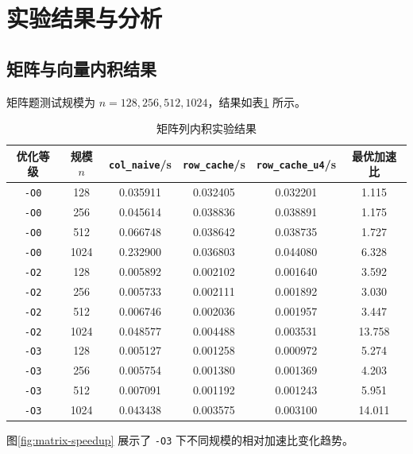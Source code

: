 \documentclass[a4paper]{article}
\begin{document}
\section{实验结果与分析}
\subsection{矩阵与向量内积结果}
矩阵题测试规模为 $n=128,256,512,1024$，结果如表\ref{tab:matrix} 所示。

\begin{table}[H]
  \centering
  \small
  \begin{tabular}{cccccc}
  \toprule
  优化等级 & 规模 $n$ & \texttt{col\_naive}/s & \texttt{row\_cache}/s & \texttt{row\_cache\_u4}/s & 最优加速比 \\
  \midrule
  \texttt{-O0} & 128  & 0.035911 & 0.032405 & 0.032201 & 1.115 \\
  \texttt{-O0} & 256  & 0.045614 & 0.038836 & 0.038891 & 1.175 \\
  \texttt{-O0} & 512  & 0.066748 & 0.038642 & 0.038735 & 1.727 \\
  \texttt{-O0} & 1024 & 0.232900 & 0.036803 & 0.044080 & 6.328 \\
  \midrule
  \texttt{-O2} & 128  & 0.005892 & 0.002102 & 0.001640 & 3.592 \\
  \texttt{-O2} & 256  & 0.005733 & 0.002111 & 0.001892 & 3.030 \\
  \texttt{-O2} & 512  & 0.006746 & 0.002036 & 0.001957 & 3.447 \\
  \texttt{-O2} & 1024 & 0.048577 & 0.004488 & 0.003531 & 13.758 \\
  \midrule
  \texttt{-O3} & 128  & 0.005127 & 0.001258 & 0.000972 & 5.274 \\
  \texttt{-O3} & 256  & 0.005754 & 0.001380 & 0.001369 & 4.203 \\
  \texttt{-O3} & 512  & 0.007091 & 0.001192 & 0.001243 & 5.951 \\
  \texttt{-O3} & 1024 & 0.043438 & 0.003575 & 0.003100 & 14.011 \\
  \bottomrule
  \end{tabular}
 \caption{矩阵列内积实验结果}
  \label{tab:matrix}
\end{table}

图\ref{fig:matrix-speedup} 展示了 \texttt{-O3} 下不同规模的相对加速比变化趋势。
\end{document}
